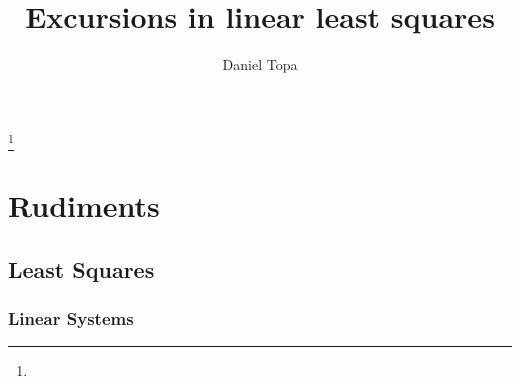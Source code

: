 \documentclass{amsbook}
\begin{document}

\frontmatter

\title{Excursions in linear least squares}

\author{Daniel Topa}
\address{}
\curraddr{}
\thanks{}



\date{}

\begin{abstract}
\end{abstract}

\maketitle

\setcounter{page}{5}

\tableofcontents



\mainmatter   %

\part{\label{part:first}Rudiments}  %

\chapter{\label{ch:least squares}Least Squares}   %

\section{\label{sec:linear systems}Linear Systems}  %
\end{document}
